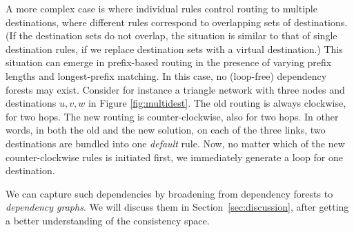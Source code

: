 A more complex case is where individual rules control routing to multiple destinations, where different rules correspond to overlapping sets of destinations. (If the destination sets do not overlap, the situation is similar to that of single destination rules, if we replace destination sets with a virtual destination.) This situation can emerge in prefix-based routing in the presence of varying prefix lengths and longest-prefix matching. In this case, no (loop-free) dependency forests may exist. Consider for instance a triangle network with three nodes and destinations $u,v,w$ in Figure \ref{fig:multidest}. The old routing is always clockwise, for two hops. The new routing is counter-clockwise, also for two hops. In other words, in both the old and the new solution, on each of the three links, two destinations are bundled into one \emph{default} rule. Now, no matter which of the new counter-clockwise rules is initiated first, we immediately generate a loop for one destination.

We can capture such dependencies by broadening from dependency forests to {\em dependency graphs}. We will discuss them in Section~\ref{sec:discussion}, after getting a better understanding of the consistency space.






